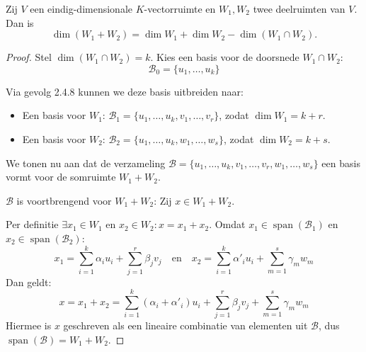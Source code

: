 \begin{stelling}
    Zij $V$ een eindig-dimensionale $K$-vectorruimte en $W_1, W_2$ twee deelruimten van $V$. Dan is
    \[ \dim(W_1 + W_2) = \dim W_1 + \dim W_2 - \dim(W_1 \cap W_2). \]
\end{stelling}
\begin{proof}
    Stel $\dim(W_1 \cap W_2) = k$. Kies een basis voor de doorsnede $W_1 \cap W_2$:
    $$ \mathcal{B}_0 = \{u_1, \dots, u_k\} $$

    Via gevolg 2.4.8 kunnen we deze basis uitbreiden naar:
    \begin{itemize}
        \item Een basis voor $W_1$: $\mathcal{B}_1 = \{u_1, \dots, u_k, v_1, \dots, v_r\}$, zodat $\dim W_1 = k + r$.
        \item Een basis voor $W_2$: $\mathcal{B}_2 = \{u_1, \dots, u_k, w_1, \dots, w_s\}$, zodat $\dim W_2 = k + s$.
    \end{itemize}

    We tonen nu aan dat de verzameling $\mathcal{B} = \{u_1, \dots, u_k, v_1, \dots, v_r, w_1, \dots, w_s\}$ een basis vormt voor de somruimte $W_1 + W_2$.

    $\mathcal{B}$ is voortbrengend voor $W_1 + W_2$:
    Zij $x \in W_1 + W_2$.

    Per definitie $\exists x_1 \in W_1$ en $x_2 \in W_2: x = x_1 + x_2$.
    Omdat $x_1 \in \operatorname{span}(\mathcal{B}_1)$ en $x_2 \in \operatorname{span}(\mathcal{B}_2)$:
    $$ x_1 = \sum_{i=1}^k \alpha_i u_i + \sum_{j=1}^r \beta_j v_j \quad \text{en} \quad x_2 = \sum_{i=1}^k \alpha'_i u_i + \sum_{m=1}^s \gamma_m w_m $$
    Dan geldt:
    $$ x = x_1 + x_2 = \sum_{i=1}^k (\alpha_i + \alpha'_i) u_i + \sum_{j=1}^r \beta_j v_j + \sum_{m=1}^s \gamma_m w_m $$
    Hiermee is $x$ geschreven als een lineaire combinatie van elementen uit $\mathcal{B}$, dus $\operatorname{span}(\mathcal{B}) = W_1 + W_2$.


\end{proof}
